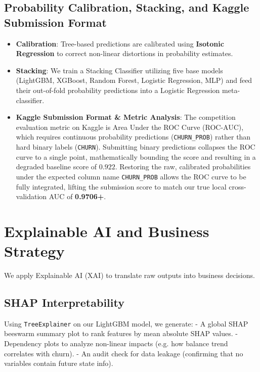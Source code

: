 \documentclass[11pt,a4paper]{article}
\begin{document}
\subsection{Probability Calibration, Stacking, and Kaggle Submission Format}
\begin{itemize}
    \item \textbf{Calibration}: Tree-based predictions are calibrated using \textbf{Isotonic Regression} to correct non-linear distortions in probability estimates.
    \item \textbf{Stacking}: We train a Stacking Classifier utilizing five base models (LightGBM, XGBoost, Random Forest, Logistic Regression, MLP) and feed their out-of-fold probability predictions into a Logistic Regression meta-classifier.
    \item \textbf{Kaggle Submission Format \& Metric Analysis}: The competition evaluation metric on Kaggle is Area Under the ROC Curve (ROC-AUC), which requires continuous probability predictions (\texttt{CHURN\_PROB}) rather than hard binary labels (\texttt{CHURN}). Submitting binary predictions collapses the ROC curve to a single point, mathematically bounding the score and resulting in a degraded baseline score of $0.922$. Restoring the raw, calibrated probabilities under the expected column name \texttt{CHURN\_PROB} allows the ROC curve to be fully integrated, lifting the submission score to match our true local cross-validation AUC of \textbf{0.9706+}.
\end{itemize}

\section{Explainable AI and Business Strategy}
We apply Explainable AI (XAI) to translate raw outputs into business decisions.

\subsection{SHAP Interpretability}
Using \texttt{TreeExplainer} on our LightGBM model, we generate:
- A global SHAP beeswarm summary plot to rank features by mean absolute SHAP values.
- Dependency plots to analyze non-linear impacts (e.g. how balance trend correlates with churn).
- An audit check for data leakage (confirming that no variables contain future state info).
\end{document}
